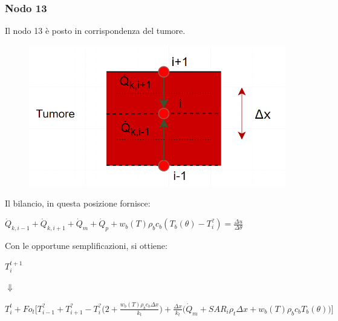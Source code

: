 \subsubsection*{Nodo 13}
Il nodo 13 è posto in corrispondenza del tumore.\\
\begin{figure}[H]
    \centering
    \includegraphics[width=.6\textwidth]{Immagini/Nodi/nodo13.png} 
    \label{nodo13}
\end{figure}
\noindent
Il bilancio, in questa posizione fornisce:
\begin{center}
	$ \Dot{Q} _{k, i-1} +\Dot{Q} _{k, i+1}+ \Dot{Q} _{m} +\Dot{Q} _{p}+ w_b (T) \rho _b c_b (T_b(\theta)-T_i ^?)= \frac{\Delta u}{\Delta \theta} $
\end{center}
Con le opportune semplificazioni, si ottiene:
\begin{center}
	$T_i ^{t+1} $
\end{center}
\begin{center}
	$\Downarrow$
\end{center}
\begin{center}
	$T_i ^t + Fo_{t} \Bigg[ T_{i-1} ^? + T_{i+1} ^?- T_i ^? \Big(2 + \frac{ w_b (T) \rho _b c_b \Delta x }{k_{t}} \Big) + \frac{\Delta x }{k_{t}} \Big(\Dot{Q} _{m} +  SAR_i \rho _{t} \Delta x + w_b (T) \rho _b c_b T_b(\theta)\Big) \Bigg]$
\end{center}




